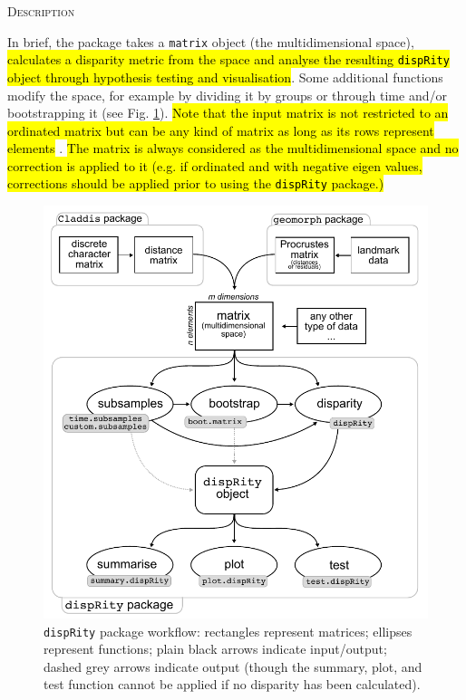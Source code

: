 \documentclass[12pt,letterpaper]{article}
\renewcommand{\section}[1]{%
\bigskip
\begin{center}
\begin{Large}
\normalfont\scshape #1
\medskip
\end{Large}
\end{center}}
\newcommand{\disp}{\texttt{dispRity} }
\begin{document}
\section{Description}
In brief, the package takes a \texttt{matrix} object (the multidimensional space), 
\hl{calculates a disparity metric from the space and analyse the resulting \texttt{dispRity} object through hypothesis testing and visualisation}.
Some additional functions modify the space, for example by dividing it by groups or through time and/or bootstrapping it (see Fig. \ref{Fig:workflow}).
\hl{Note that the input matrix is not restricted to an ordinated matrix but can be any kind of matrix as long as its rows represent elements} \citep[e.g. the space can be a distance matrix][]{Close2015}.
\hl{The matrix is always considered as the multidimensional space and no correction is applied to it (e.g. if ordinated and with negative eigen values, corrections should be applied prior to using the \texttt{dispRity} package.)}

\begin{figure}[!htbp]
\centering
   \includegraphics[width=1\textwidth]{workflowsvg.pdf} 
\caption{\disp package workflow: rectangles represent matrices; ellipses represent functions; plain black arrows indicate input/output; dashed grey arrows indicate output (though the summary, plot, and test function cannot be applied if no disparity has been calculated).}
\label{Fig:workflow}
\end{figure}
\end{document}
